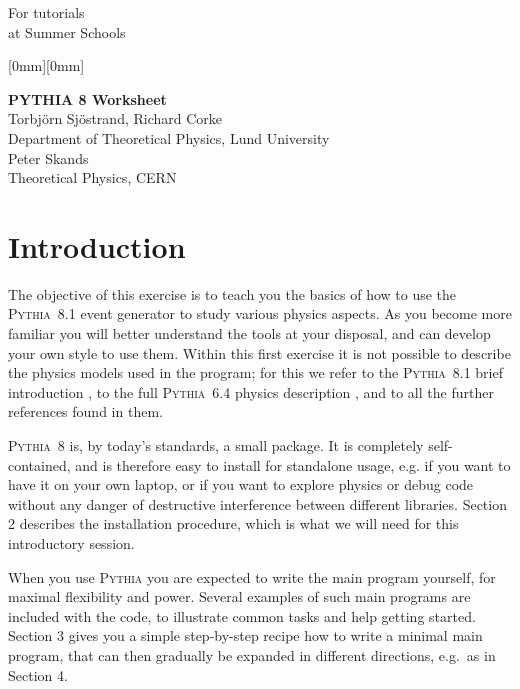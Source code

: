 \documentclass[12pt,a4paper]{article}
\begin{document}
 
\sloppy

\begin{flushright}
For tutorials\\
at Summer Schools
\end{flushright}

\vspace{-20mm}
\mbox{}%
\hspace{30mm}%
\raisebox{4mm}[0mm][0mm]{}\\[6mm]

\begin{center}
{\LARGE\bf PYTHIA 8 Worksheet}\\[10mm]
{\large Torbj\"orn Sj\"ostrand, Richard Corke}\\[1mm]
Department of Theoretical Physics, Lund University\\[4mm]
{\large Peter Skands}\\[1mm]
Theoretical Physics, CERN\\[15mm]
\end{center}

\section{Introduction}

The objective of this exercise is to teach you the basics of how to use 
the \textsc{Pythia}~8.1 event generator to study various physics aspects.
As you become more familiar you will better understand the tools at
your disposal, and can develop your own style to use them. Within this 
first exercise it is not possible to describe the physics models used 
in the program; for this we refer to the \textsc{Pythia}~8.1 brief 
introduction \cite{pythiaeight}, to the full \textsc{Pythia}~6.4
physics description \cite{pythiasix}, and to all the further references
found in them.

\textsc{Pythia}~8 is, by today's standards, a small package.
It is completely self-contained, and is therefore easy to install for
standalone usage, e.g. if you want to have it on your own laptop,
or if you want to explore physics or debug code without any danger 
of destructive interference between different libraries. Section 2 
describes the installation procedure, which is what we will need for 
this introductory session.

When you use \textsc{Pythia} you are expected to write the main program
yourself, for maximal flexibility and power. Several examples of such
main programs are included with the code, to illustrate common tasks
and help getting started. Section 3 gives you a simple step-by-step 
recipe how to write a minimal main program, that can then gradually 
be expanded in different directions, e.g.\ as in Section 4.
\end{document}
